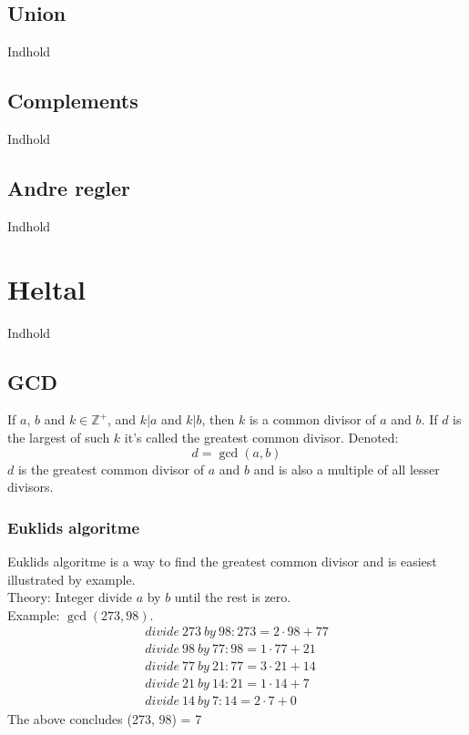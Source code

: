 \documentclass[a4paper]{article}
\newcommand{\Integers}{\mathbb{Z}}
\begin{document}
  \subsection{Union}
    Indhold
  \subsection{Complements}
    Indhold
  \subsection{Andre regler}
    Indhold
\section{Heltal}
  Indhold
  \subsection{GCD}
    If $a$, $b$ and $k \in \Integers^+$, and $k | a$ and $k | b$, then $k$ is a common divisor of $a$ and $b$. If $d$ is the largest of such $k$ it's called the greatest common divisor. Denoted:
    $$d = \operatorname{gcd}(a, b)$$
    $d$ is the greatest common divisor of $a$ and $b$ and is also a multiple of all lesser divisors.
    \subsubsection{Euklids algoritme}
     Euklids algoritme is a way to find the greatest common divisor and is easiest illustrated by example.\\
     Theory: Integer divide $a$ by $b$ until the rest is zero.\\
     Example: $\operatorname{gcd}(273, 98)$.%
     \begin{eqnarray}
      divide\ 273\ by\ 98:	273 = 2 \cdot 98 + 77\\
      divide\ 98\ by\ 77:	98 = 1 \cdot 77 + 21\\
      divide\ 77\ by\ 21:	77 = 3 \cdot 21 + 14\\
      divide\ 21\ by\ 14:	21 = 1 \cdot 14 + 7\\
      divide\ 14\ by\ 7:	14 = 2 \cdot 7 + 0
     \end{eqnarray}
     The above concludes (273, 98) = 7
\end{document}
